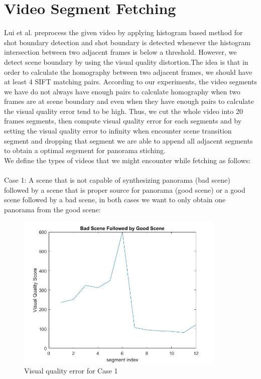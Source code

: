 \documentclass[12pt]{article}
\begin{document}
\section{Video Segment Fetching}
Lui et al. preprocess the given video by applying histogram based method for shot boundary detection and shot boundary is detected whenever the histogram intersection between two adjacent frames is below a threshold. 
However, we detect scene boundary by using the visual quality distortion.The idea is that in order to calculate the homography between two adjacent frames, we should have at least 4 SIFT matching pairs. According to our experiments, the video segments we have do not always have enough pairs to calculate homography when two frames are at scene boundary and even when they have enough pairs to calculate the visual quality error tend to be high. Thus, we cut the whole video into 20 frames segments, then compute visual quality error for each segments and by setting the visual quality error to infinity when encounter scene transition segment and dropping that segment we are able to append all adjacent segments to obtain a optimal segement for panorama stiching. \\
We define the types of videos that we might encounter while fetching as follows: \\
\\
Case 1: A scene that is not capable of synthesizing panorama (bad scene) followed by a scene that is proper source for panorama (good scene) or a good scene followed by a bad scene, in both cases we want to only obtain one panorama from the good scene:
\begin{figure}[h]
	\centering
	\includegraphics[width=10cm]{bad-good-fig}
	\caption{Visual quality error for Case 1}
\end{figure}\\
\end{document}
